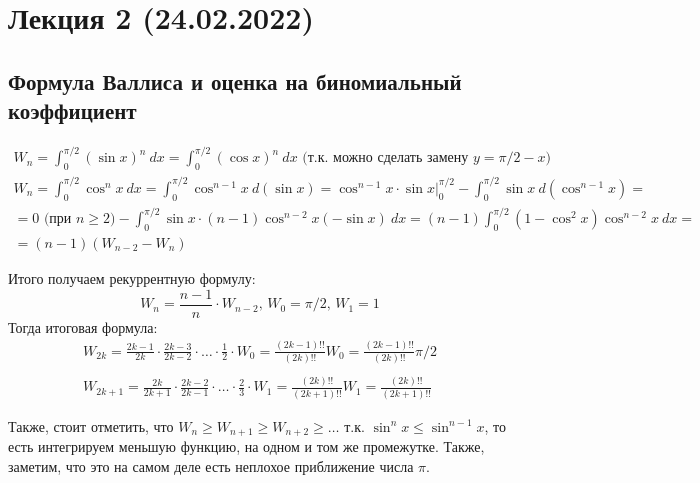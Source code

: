 \section*{Лекция 2 (24.02.2022)}
\subsection{Формула Валлиса и оценка на биномиальный коэффициент}
\begin{example}
 \[
     \begin{gathered}
         W_n = \int_0^{\pi / 2}{(\sin{x})^n}\ dx = \int_0^{\pi / 2}{(\cos{x})^n}\ dx 
          \text{ (т.к. можно сделать замену $y = \pi / 2 - x$)}
         \\
         W_n = \int_0^{\pi / 2}\cos^n{x}\ dx = \int_0^{\pi / 2}\cos^{n - 1}{x}\ d(\sin{x}) =
         \cos^{n - 1}{x} \cdot \sin{x} \bigg|_{0}^{\pi/2} - \int_{0}^{\pi / 2}\sin{x}\ d(\cos^{n - 1}{x}) = \\
         = 0 \text{ (при $n \geqslant 2$)} - \int_0^{\pi / 2} \sin{x} \cdot (n - 1) \cos^{n - 2}{x}(-\sin{x})\ dx =
         (n - 1)\int_{0}^{\pi / 2}(1 - \cos^2{x}) \cos^{n - 2}{x}\ dx =\\ 
         = (n - 1)(W_{n - 2} - W_{n})
     \end{gathered}
\]

Итого получаем рекуррентную формулу:
\[
    W_n = \frac{n - 1}{n} \cdot W_{n - 2}, \, W_0 = \pi / 2, \, W_1 = 1
\]
Тогда итоговая формула:
\[
    \begin{gathered}
        W_{2k} = \frac{2k - 1}{2k} \cdot \frac{2k - 3}{2k - 2} \cdot \ldots \cdot \frac{1}{2} \cdot W_0 =
        \frac{(2k - 1)!!}{(2k)!!} W_0 = \frac{(2k - 1)!!}{(2k)!!} \pi / 2
        \\\\
        W_{2k + 1} = \frac{2k}{2k + 1} \cdot \frac{2k - 2}{2k - 1} \cdot \ldots \cdot \frac{2}{3} \cdot W_1 =
        \frac{(2k)!!}{(2k + 1)!!} W_1 = \frac{(2k)!!}{(2k + 1)!!} 
    \end{gathered}
\]

Также, стоит отметить, что $W_n \geqslant W_{n + 1} \geqslant W_{n + 2} \geqslant \dots$ т.к.
$\sin^n{x} \leqslant \sin^{n - 1}{x}$, то есть интегрируем меньшую функцию, на одном и том же промежутке.
Также, заметим, что это на самом деле есть неплохое приближение числа $\pi$.\\


\end{example}
